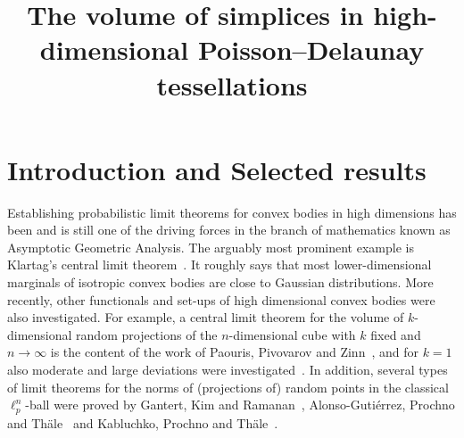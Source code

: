 \documentclass[AHL,Unicode,longabstracts,published]{cedram}
\title[Simplices in Poisson--Delaunay tessellations]{The volume of simplices in high-dimensional Poisson--Delaunay tessellations}
\author{\firstname{Anna} \lastname{Gusakova}}
\author{\firstname{Christoph} \lastname{Th\"ale}}
\begin{document}
\maketitle

\section{Introduction and Selected results}

Establishing probabilistic limit theorems for convex bodies in high dimensions has been and is still one of the driving forces in the branch of mathematics known as Asymptotic Geometric Analysis. The arguably most prominent example is Klartag's central limit theorem~\cite{KlartagCLT}. It roughly says that most lower-dimensional marginals of isotropic convex bodies are close to Gaussian distributions. More recently, other functionals and set-ups of high dimensional convex bodies were also investigated. For example, a central limit theorem for the volume of $k$-dimensional random projections of the $n$-dimensional cube with $k$ fixed and $n\to\infty$ is the content of the work of Paouris, Pivovarov and Zinn~\cite{PPZ}, and for $k=1$ also moderate and large deviations were investigated~\cite{KPT19a,KPT19b}. In addition, several types of limit theorems for the norms of (projections of) random points in the classical $\ell_p^n$-ball were proved by Gantert, Kim and Ramanan~\cite{GKR}, Alonso-Gutiérrez, Prochno and Th\"ale~\cite{APT18,APT17} and Kabluchko, Prochno and Th\"ale~\cite{KPT19a,KPT19b}.
\end{document}
